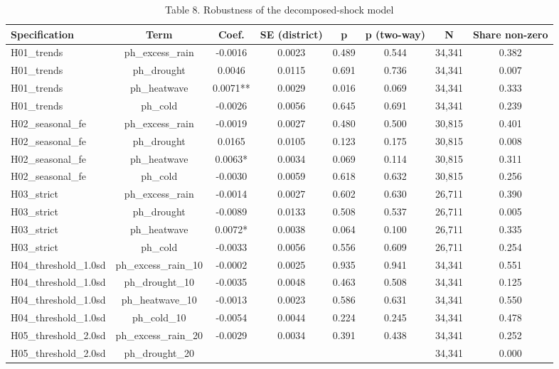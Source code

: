 \begin{table}[htbp]\centering\small
\caption{Table 8. Robustness of the decomposed-shock model}\label{tab:table8_heat_robustness}
\begin{tabular}{lccccccc}
\toprule
Specification & Term & Coef. & SE (district) & p & p (two-way) & N & Share non-zero \\
\midrule
H01\_trends & ph\_excess\_rain & -0.0016 & 0.0023 & 0.489 & 0.544 & 34,341 & 0.382 \\
H01\_trends & ph\_drought & 0.0046 & 0.0115 & 0.691 & 0.736 & 34,341 & 0.007 \\
H01\_trends & ph\_heatwave & 0.0071** & 0.0029 & 0.016 & 0.069 & 34,341 & 0.333 \\
H01\_trends & ph\_cold & -0.0026 & 0.0056 & 0.645 & 0.691 & 34,341 & 0.239 \\
H02\_seasonal\_fe & ph\_excess\_rain & -0.0019 & 0.0027 & 0.480 & 0.500 & 30,815 & 0.401 \\
H02\_seasonal\_fe & ph\_drought & 0.0165 & 0.0105 & 0.123 & 0.175 & 30,815 & 0.008 \\
H02\_seasonal\_fe & ph\_heatwave & 0.0063* & 0.0034 & 0.069 & 0.114 & 30,815 & 0.311 \\
H02\_seasonal\_fe & ph\_cold & -0.0030 & 0.0059 & 0.618 & 0.632 & 30,815 & 0.256 \\
H03\_strict & ph\_excess\_rain & -0.0014 & 0.0027 & 0.602 & 0.630 & 26,711 & 0.390 \\
H03\_strict & ph\_drought & -0.0089 & 0.0133 & 0.508 & 0.537 & 26,711 & 0.005 \\
H03\_strict & ph\_heatwave & 0.0072* & 0.0038 & 0.064 & 0.100 & 26,711 & 0.335 \\
H03\_strict & ph\_cold & -0.0033 & 0.0056 & 0.556 & 0.609 & 26,711 & 0.254 \\
H04\_threshold\_1.0sd & ph\_excess\_rain\_10 & -0.0002 & 0.0025 & 0.935 & 0.941 & 34,341 & 0.551 \\
H04\_threshold\_1.0sd & ph\_drought\_10 & -0.0035 & 0.0048 & 0.463 & 0.508 & 34,341 & 0.125 \\
H04\_threshold\_1.0sd & ph\_heatwave\_10 & -0.0013 & 0.0023 & 0.586 & 0.631 & 34,341 & 0.550 \\
H04\_threshold\_1.0sd & ph\_cold\_10 & -0.0054 & 0.0044 & 0.224 & 0.245 & 34,341 & 0.478 \\
H05\_threshold\_2.0sd & ph\_excess\_rain\_20 & -0.0029 & 0.0034 & 0.391 & 0.438 & 34,341 & 0.252 \\
H05\_threshold\_2.0sd & ph\_drought\_20 &  &  &  &  & 34,341 & 0.000 \\

\end{tabular}
\end{table}
